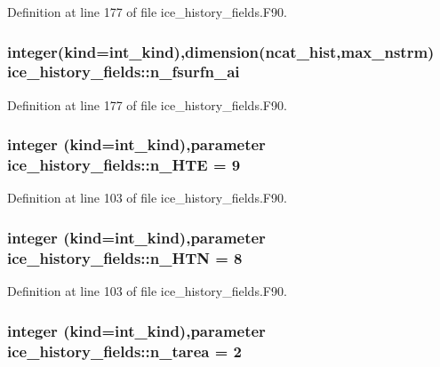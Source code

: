 Definition at line 177 of file ice\_\-history\_\-fields.F90.\hypertarget{namespaceice__history__fields_a547e15c8d6d1890d8acb698c12ca6583}{
\subsubsection[{n\_\-fsurfn\_\-ai}]{\setlength{\rightskip}{0pt plus 5cm}integer(kind=int\_\-kind),dimension({\bf ncat\_\-hist},max\_\-nstrm) {\bf ice\_\-history\_\-fields::n\_\-fsurfn\_\-ai}}}
\label{namespaceice__history__fields_a547e15c8d6d1890d8acb698c12ca6583}


Definition at line 177 of file ice\_\-history\_\-fields.F90.\hypertarget{namespaceice__history__fields_ae2441593355b72e80279087bc9b631c3}{
\subsubsection[{n\_\-HTE}]{\setlength{\rightskip}{0pt plus 5cm}integer (kind=int\_\-kind),parameter {\bf ice\_\-history\_\-fields::n\_\-HTE} = 9}}
\label{namespaceice__history__fields_ae2441593355b72e80279087bc9b631c3}


Definition at line 103 of file ice\_\-history\_\-fields.F90.\hypertarget{namespaceice__history__fields_a2fd568cf96c89f8164ffb0a11143bdbe}{
\subsubsection[{n\_\-HTN}]{\setlength{\rightskip}{0pt plus 5cm}integer (kind=int\_\-kind),parameter {\bf ice\_\-history\_\-fields::n\_\-HTN} = 8}}
\label{namespaceice__history__fields_a2fd568cf96c89f8164ffb0a11143bdbe}


Definition at line 103 of file ice\_\-history\_\-fields.F90.\hypertarget{namespaceice__history__fields_aede613891c36b6de42a6b5dfa94a6c47}{
\subsubsection[{n\_\-tarea}]{\setlength{\rightskip}{0pt plus 5cm}integer (kind=int\_\-kind),parameter {\bf ice\_\-history\_\-fields::n\_\-tarea} = 2}}
\label{namespaceice__history__fields_aede613891c36b6de42a6b5dfa94a6c47}


